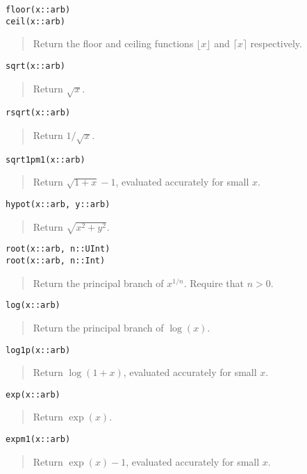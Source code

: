 \documentclass[a4paper,10pt]{article}
\newcommand{\desc}[1]{\vspace{-3mm}\begin{quote}#1\end{quote}}
\begin{document}
{{\begin{lstlisting}
floor(x::arb)
ceil(x::arb)
\end{lstlisting}

\desc{Return the floor and ceiling functions $\lfloor x \rfloor$ and
$\lceil x \rceil$ respectively.}

\begin{lstlisting}
sqrt(x::arb)
\end{lstlisting}

\desc{Return $\sqrt{x}$.}

\begin{lstlisting}
rsqrt(x::arb)
\end{lstlisting}

\desc{Return $1 / \sqrt{x}$.}

\begin{lstlisting}
sqrt1pm1(x::arb)
\end{lstlisting}

\desc{Return $\sqrt{1+x}-1$, evaluated accurately for small $x$.}

\begin{lstlisting}
hypot(x::arb, y::arb)
\end{lstlisting}

\desc{Return $\sqrt{x^2 + y^2}$.}

\begin{lstlisting}
root(x::arb, n::UInt)
root(x::arb, n::Int)
\end{lstlisting}

\desc{Return the principal branch of $x^{1/n}$. Require that $n > 0$.}

\begin{lstlisting}
log(x::arb)
\end{lstlisting}

\desc{Return the principal branch of $\log(x)$.}

\begin{lstlisting}
log1p(x::arb)
\end{lstlisting}

\desc{Return $\log(1+x)$, evaluated accurately for small $x$.}

\begin{lstlisting}
exp(x::arb)
\end{lstlisting}

\desc{Return $\exp(x)$.}

\begin{lstlisting}
expm1(x::arb)
\end{lstlisting}

\desc{Return $\exp(x)-1$, evaluated accurately for small $x$.}

}}
\end{document}
